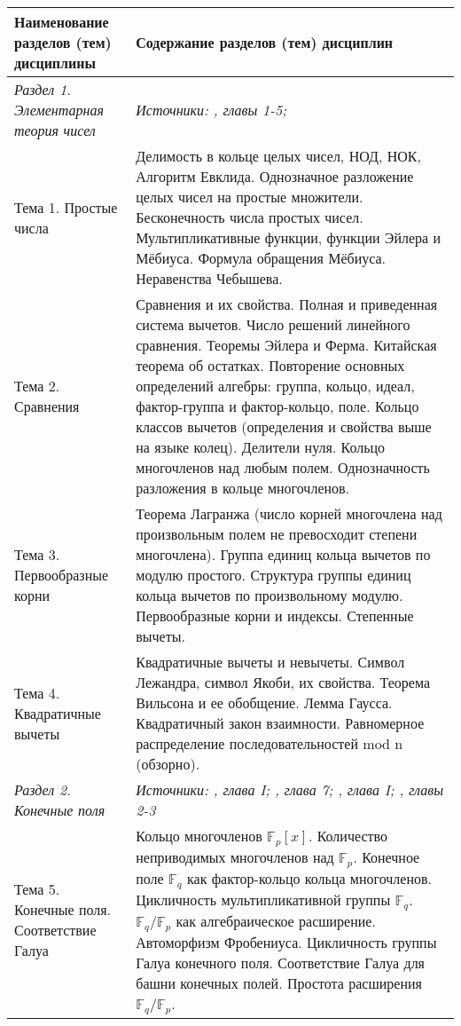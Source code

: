 \documentclass[a4paper, 12pt]{article}
\begin{document}
\noindent
\begin{longtable}{ | >{\raggedright}p{6cm} | p{9cm} | } 
    \hline
    \textbf{Наименование разделов (тем) дисциплины} & \textbf{Содержание разделов (тем) дисциплин} \\
    \hline
    \hline
    \textit{Раздел 1. Элементарная теория чисел} & \textit{Источники: \cite{Vin}, главы 1-5; \cite{IR}} \\ \hline
    Тема 1. Простые числа & Делимость в кольце целых чисел, НОД, НОК, Алгоритм Евклида. Однозначное разложение целых чисел на простые множители. Бесконечность числа простых чисел. Мультипликативные функции, функции Эйлера и Мёбиуса. Формула обращения Мёбиуса. Неравенства Чебышева. \\ \hline
    Тема 2. Сравнения & Сравнения и их свойства. Полная и приведенная система вычетов. Число решений линейного сравнения. Теоремы Эйлера и Ферма. Китайская теорема об остатках. Повторение основных определений алгебры: группа, кольцо, идеал, фактор-группа и фактор-кольцо, поле. Кольцо классов вычетов (определения и свойства выше на языке колец). Делители нуля. Кольцо многочленов над любым полем. Однозначность разложения в кольце многочленов. \\ \hline
    Тема 3. Первообразные корни & Теорема Лагранжа (число корней многочлена над произвольным полем не превосходит степени многочлена). Группа единиц кольца вычетов по модулю простого. Структура группы единиц кольца вычетов по произвольному модулю. Первообразные корни и индексы. Степенные вычеты. \\ \hline
    Тема 4. Квадратичные вычеты & Квадратичные вычеты и невычеты. Символ Лежандра, символ Якоби, их свойства. Теорема Вильсона и ее обобщение. Лемма Гаусса. Квадратичный закон взаимности. Равномерное распределение последовательностей mod n (обзорно). \\ \hline
    \textit{Раздел 2. Конечные поля} & \textit{Источники: \cite{Step}, глава I; \cite{IR}, глава 7; \cite{Serre}, глава I; \cite{LN}, главы 2-3} \\ \hline
    Тема 5. Конечные поля. Соответствие Галуа & Кольцо многочленов $\mathbb{F}_p[x]$. Количество неприводимых многочленов над $\mathbb{F}_p$. Конечное поле $\mathbb{F}_q$ как фактор-кольцо кольца многочленов. Цикличность мультипликативной группы $\mathbb{F}_q$. $\mathbb{F}_q/\mathbb{F}_p$ как алгебраическое расширение. Автоморфизм Фробениуса. Цикличность группы Галуа конечного поля. Соответствие Галуа для башни конечных полей. Простота расширения $\mathbb{F}_q/\mathbb{F}_p$. \\ \hline

\end{longtable}
\end{document}
